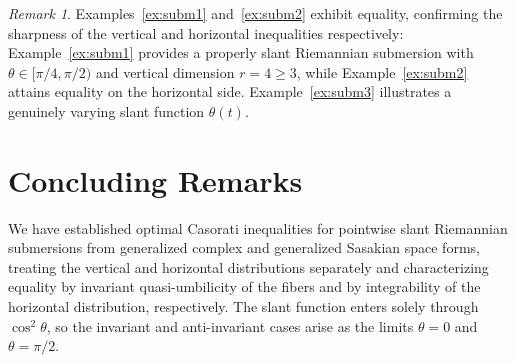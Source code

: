 \documentclass[11pt]{amsart}
\theoremstyle{plain}
\theoremstyle{definition}
\theoremstyle{remark}
\newtheorem{remark}[proposition]{Remark}
\begin{document}
\begin{remark}\label{rem:examples}
Examples~\ref{ex:subm1} and~\ref{ex:subm2} exhibit equality, confirming the
sharpness of the vertical and horizontal inequalities respectively:
Example~\ref{ex:subm1} provides a properly slant Riemannian submersion with $\theta\in[\pi/4,\pi/2)$ and vertical dimension $r=4\ge 3$, while
Example~\ref{ex:subm2} attains equality on the horizontal side. 
Example~\ref{ex:subm3} illustrates a genuinely varying slant function
$\theta(t)$.
\end{remark}

\section{ Concluding Remarks}\label{sec:discussion}


We have established optimal Casorati inequalities for pointwise slant Riemannian
submersions from generalized complex and generalized Sasakian space forms,
treating the vertical and horizontal distributions separately and
characterizing equality by invariant quasi-umbilicity of the fibers and by
integrability of the horizontal distribution, respectively. The slant function
enters solely through $\cos^2\theta$, so the invariant and anti-invariant cases
arise as the limits $\theta=0$ and $\theta=\pi/2$. 
\end{document}
